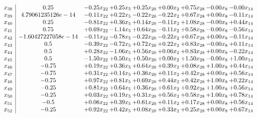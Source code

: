 \documentclass[8pt]{article}
\begin{document}
\[\begin{array}{c| c c@{\hskip 2pt} c@{\hskip 2pt} c@{\hskip 2pt} c@{\hskip 2pt} c@{\hskip 2pt} c@{\hskip 2pt} c@{\hskip 2pt} }
 x_{38}   &  0.25 & -0.25 x_{22} & +  0.25 x_{5} & +  0.25 x_{20} & +  0.00 x_{2} & +  0.75 x_{28} & -0.00 x_{8} & -0.00 x_{14}\\
 x_{39}   &  4.79061235126e-14 & -0.11 x_{22} & +  0.22 x_{5} & -0.22 x_{20} & -0.22 x_{2} & +  0.67 x_{28} & +  0.00 x_{8} & -0.11 x_{14}\\
 x_{40}   &  0.25 & -0.81 x_{22} & +  0.36 x_{5} & +  0.14 x_{20} & -0.11 x_{2} & +  1.08 x_{28} & -0.00 x_{8} & +  0.44 x_{14}\\
 x_{41}   &  0.75 & +  0.69 x_{22} & -1.14 x_{5} & +  0.64 x_{20} & -0.11 x_{2} & +  0.58 x_{28} & -0.00 x_{8} & -0.56 x_{14}\\
 x_{42}   &  -1.60427227058e-14 & -0.11 x_{22} & -0.78 x_{5} & -0.22 x_{20} & -0.22 x_{2} & +  0.67 x_{28} & +  0.00 x_{8} & -0.11 x_{14}\\
 x_{43}   &  0.5 & -0.39 x_{22} & -0.72 x_{5} & +  0.72 x_{20} & +  0.22 x_{2} & +  0.83 x_{28} & -0.00 x_{8} & +  0.11 x_{14}\\
 x_{44}   &  0.5 & +  0.28 x_{22} & -1.06 x_{5} & +  0.56 x_{20} & +  0.06 x_{2} & +  0.83 x_{28} & +  0.00 x_{8} & -0.22 x_{14}\\
 x_{45}   &  0.5 & -1.50 x_{22} & +  0.50 x_{5} & +  0.50 x_{20} & +  0.00 x_{2} & +  1.50 x_{28} & -0.00 x_{8} & +  1.00 x_{14}\\
 x_{46}   &  -0.75 & +  0.19 x_{22} & +  0.36 x_{5} & +  0.64 x_{20} & +  0.39 x_{2} & +  0.08 x_{28} & +  1.00 x_{8} & +  0.44 x_{14}\\
 x_{47}   &  -0.75 & +  0.31 x_{22} & +  0.14 x_{5} & +  0.36 x_{20} & +  0.11 x_{2} & +  0.42 x_{28} & +  0.00 x_{8} & +  0.56 x_{14}\\
 x_{48}   &  -0.75 & +  0.97 x_{22} & +  0.81 x_{5} & +  0.69 x_{20} & +  0.44 x_{2} & +  0.42 x_{28} & +  1.00 x_{8} & +  0.22 x_{14}\\
 x_{49}   &  -0.25 & +  0.81 x_{22} & +  0.64 x_{5} & +  0.36 x_{20} & +  0.61 x_{2} & +  0.92 x_{28} & +  1.00 x_{8} & +  0.56 x_{14}\\
 x_{50}   &  -0.25 & +  0.03 x_{22} & +  0.19 x_{5} & +  0.31 x_{20} & +  0.56 x_{2} & +  0.58 x_{28} & +  1.00 x_{8} & +  0.78 x_{14}\\
 x_{51}   &  -0.5 & +  0.06 x_{22} & +  0.39 x_{5} & +  0.61 x_{20} & +  0.11 x_{2} & +  0.17 x_{28} & +  0.00 x_{8} & +  0.56 x_{14}\\
 x_{52}   &  -0.25 & +  0.92 x_{22} & +  0.42 x_{5} & +  0.08 x_{20} & +  0.33 x_{2} & +  0.25 x_{28} & +  0.00 x_{8} & +  0.67 x_{14}\\

\end{array}\]
\end{document}
